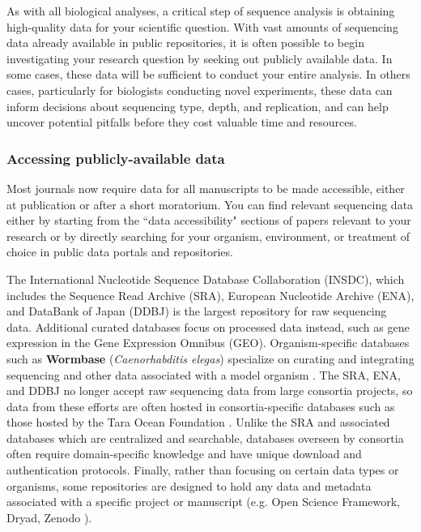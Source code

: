 \documentclass[10pt,letterpaper]{article}
\begin{document}
As with all biological analyses, a critical step of sequence analysis is obtaining high-quality data for your scientific question. 
With vast amounts of sequencing data already available in public repositories, it is often possible to begin investigating your research question by seeking out publicly available data. 
In some cases, these data will be sufficient to conduct your entire analysis. 
In others cases, particularly for biologists conducting novel experiments, these data can inform decisions about sequencing type, depth, and replication, and can help uncover potential pitfalls before they cost valuable time and resources.

\subsubsection*{Accessing publicly-available data}

Most journals now require data for all manuscripts to be made accessible, either at publication or after a short moratorium.
You can find relevant sequencing data either by starting from the ``data accessibility" sections of papers relevant to your research or by directly searching for your organism, environment, or treatment of choice in public data portals and repositories. 

The International Nucleotide Sequence Database Collaboration (INSDC), which includes the Sequence Read Archive (SRA), European Nucleotide Archive (ENA), and DataBank of Japan (DDBJ) is the largest repository for raw sequencing data. 
Additional curated databases focus on processed data instead, such as gene expression in the Gene Expression Omnibus (GEO).  
Organism-specific databases such as \textbf{Wormbase} (\textit{Caenorhabditis elegas}) specialize on curating and integrating sequencing and other data associated with a model organism \cite{harris2020wormbase}. 
The SRA, ENA, and DDBJ no longer accept raw sequencing data from large consortia projects, so data from these efforts are often hosted in consortia-specific databases such as those hosted by the Tara Ocean Foundation \cite{pesant2015open}.
Unlike the SRA and associated databases which are centralized and searchable, databases overseen by consortia often require domain-specific knowledge and have unique download and authentication protocols.
Finally, rather than focusing on certain data types or organisms, some repositories are designed to hold any data and metadata associated with a specific project or manuscript (e.g. Open Science Framework, Dryad, Zenodo \cite{foster2017open}).
\end{document}
